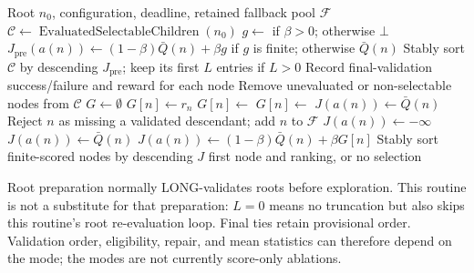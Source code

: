 \documentclass[11pt]{article}
\newcommand{\none}{\bot}
\newcommand{\MeanRoot}{\bar Q}
\newcommand{\EvalChildren}{\operatorname{EvaluatedSelectableChildren}}
\begin{document}
\begin{algorithm}[H]
\caption{FinalSelect: one finalization attempt}
\small
\begin{algorithmic}[1]
\Require Root $n_0$, configuration, deadline, retained fallback pool $\mathcal F$
\State $\mathcal C\gets\EvalChildren(n_0)$
  \State $g\gets$  if $\beta>0$; otherwise $\none$
  \State $J_{\mathrm{pre}}(a(n))\gets(1-\beta)\MeanRoot(n)+\beta g$ if $g$ is finite; otherwise $\MeanRoot(n)$
\EndFor
\State Stably sort $\mathcal C$ by descending $J_{\mathrm{pre}}$; keep its first $L$ entries if $L>0$
    \State {}
    \State Record final-validation success/failure and reward for each node
  \EndFor
\EndIf
\State Remove unevaluated or non-selectable nodes from $\mathcal C$
\State $G\gets\emptyset$
      \State $G[n]\gets r_n$
      \State $G[n]\gets$ 
    \Else
      \State $G[n]\gets$ 
    \EndIf
  \EndFor
  \State {}
  \State {}
\EndIf
{}
    \State $J(a(n))\gets\MeanRoot(n)$ 
      \State Reject $n$ as missing a validated descendant; add $n$ to $\mathcal F$
      \State $J(a(n))\gets-\infty$
    \Else
      \State $J(a(n))\gets\MeanRoot(n)$ 
    \EndIf
  \Else
    \State $J(a(n))\gets(1-\beta)\MeanRoot(n)+\beta G[n]$
  \EndIf
\EndFor
\State Stably sort finite-scored nodes by descending $J$
\State \Return first node and ranking, or no selection
\end{algorithmic}
\end{algorithm}
{\footnotesize
Root preparation normally LONG-validates roots before exploration. This routine
is not a substitute for that preparation: $L=0$ means no truncation but also
skips this routine's root re-evaluation loop. Final ties retain provisional
order. Validation order, eligibility, repair, and mean statistics can therefore
depend on the mode; the modes are not currently score-only ablations.\par}
\end{document}
